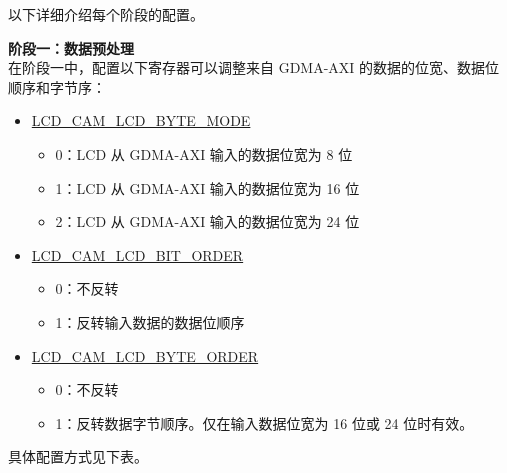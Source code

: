 \documentclass[main\_\_CN.tex]{subfiles}
\begin{document}
以下详细介绍每个阶段的配置。

\textbf{阶段一：数据预处理} \\

在阶段一中，配置以下寄存器可以调整来自 GDMA-AXI 的数据的位宽、数据位顺序和字节序：

\begin{itemize}
    \item \hyperref[fielddesc:LCDCAMLCDBYTEMODE]{LCD\_CAM\_LCD\_BYTE\_MODE}
    \begin{itemize}
        \item 0：LCD 从 GDMA-AXI 输入的数据位宽为 8 位
        \item 1：LCD 从 GDMA-AXI 输入的数据位宽为 16 位
        \item 2：LCD 从 GDMA-AXI 输入的数据位宽为 24 位
    \end{itemize}
    \item \hyperref[fielddesc:LCDCAMLCDBITORDER]{LCD\_CAM\_LCD\_BIT\_ORDER}
    \begin{itemize}
        \item 0：不反转
        \item 1：反转输入数据的数据位顺序
    \end{itemize}
    \item \hyperref[fielddesc:LCDCAMLCDBYTEORDER]{LCD\_CAM\_LCD\_BYTE\_ORDER}
    \begin{itemize}
        \item 0：不反转
        \item 1：反转数据字节顺序。仅在输入数据位宽为 16 位或 24 位时有效。
    \end{itemize}

\end{itemize}

具体配置方式见下表。
\end{document}
